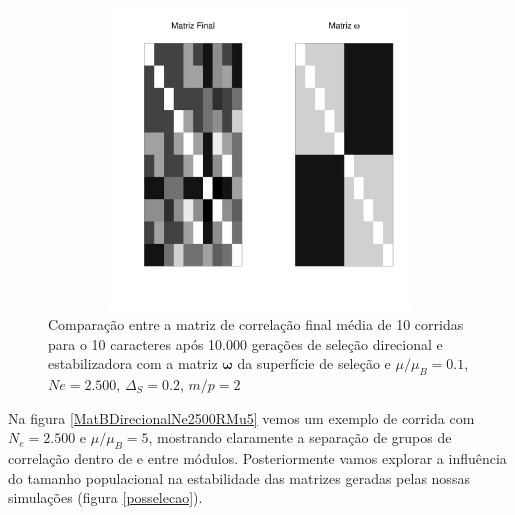 \begin{figure}[htbp]
    \centering
    \includegraphics[width=150mm, height=80mm]{figuras/RMu01Omega}
    \caption{Comparação entre a matriz de correlação final média de 10
        corridas para o 10 caracteres após 10.000 gerações de seleção direcional e
        estabilizadora com a matriz $\pmb{\omega}$ da superfície de seleção e
    $\mu/\mu_B=0.1$, $Ne=2.500$, $\Delta_S=0.2$, $m/p=2$}
    \label{RMu01}
\end{figure}

Na figura \ref{MatBDirecionalNe2500RMu5} vemos um exemplo de corrida com
$N_e = 2.500$ e $\mu/\mu_B=5$, mostrando claramente a separação de grupos
de correlação dentro de e entre módulos.
Posteriormente vamos explorar a influência do tamanho populacional na
estabilidade das matrizes geradas pelas nossas simulações (figura
\ref{posselecao}).

